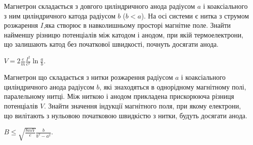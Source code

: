 \begin{problem}
Магнетрон складається з довгого циліндричного анода радіусом $a$ і коаксіального з ним циліндричного катода радіусом $b$ ($b < a $). На осі системи є нитка з струмом розжарення $I$,яка створює в навколишньому просторі магнітне поле. Знайти найменшу різницю потенціалів між катодом і анодом, при якій термоелектрони, що залишають катод без початкової швидкості, почнуть досягати анода.
\begin{solution}
	$V = 2\frac{e}{m}\frac{I^2}{c^2}\ln\frac{a}{b}$.
\end{solution}
\end{problem}


\begin{problem}
Магнетрон що складається з нитки розжарення радіусом $a$ і коаксіального циліндричного анода радіусом $b$, які знаходяться в однорідному магнітному полі, паралельному нитці. Між ниткою і анодом прикладена прискорююча різниця потенціалів $V$. Знайти значення індукції магнітного
поля, при якому електрони, що вилітають з нульовою початковою швидкістю з нитки, будуть досягати анода.
\begin{solution}
	$B \le \sqrt{\frac{8mV}{e}} \frac{b}{b^2 - a^2}$.
\end{solution}
\end{problem}


